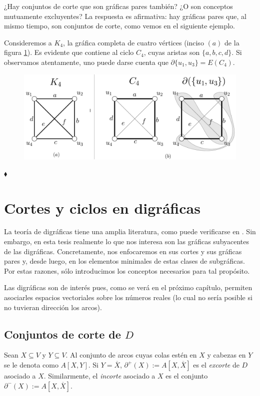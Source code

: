 ¿Hay conjuntos de corte que son gráficas pares también? ¿O son conceptos mutuamente excluyentes? La respuesta es afirmativa: hay gráficas pares que, al mismo tiempo, son conjuntos de corte, como vemos en el siguiente ejemplo.
\vspace{0.5cm}
\begin{ejem} \label{ejem:k4ciclocorte}
Consideremos a $K_{4}$, la gráfica completa de cuatro vértices (inciso $(a)$ de la figura \ref{fig:k4ciclocorte}). Es evidente que contiene al ciclo $C_{4}$, cuyas aristas son $\{a,b,c,d\}$. Si observamos atentamente, uno puede darse cuenta que $\partial{\{u_{1},u_{3}\}} = E(C_{4})$.

 \begin{figure}[H]
     \centering
     \includegraphics[scale=0.2]{img/imgchapter2/k4ciclocorte.jpg}
     \caption{}
     \label{fig:k4ciclocorte}
 \end{figure}

 \hfill $\blacklozenge$
\end{ejem}
 
 

 
 \section{Cortes y ciclos en digráficas}
 La teoría de digráficas tiene una amplia literatura, como puede verificarse en \cite{Bang-Jensen}. Sin embargo, en esta tesis realmente lo que nos interesa son las gráficas subyacentes de las digráficas. Concretamente, nos enfocaremos en sus cortes y sus gráficas pares y, desde luego, en los elementos minimales de estas clases de subgráficas. Por estas razones, sólo introducimos los conceptos necesarios para tal propósito.
 
 Las digráficas son de interés pues, como se verá en el próximo capítulo, permiten asociarles espacios vectoriales sobre los números reales (lo cual no sería posible si no tuvieran dirección los arcos).


 \subsection{Conjuntos de corte de $D$}
 Sean $X \subseteq V$ y $Y \subseteq V$. Al conjunto de arcos cuyas colas estén en $X$ y cabezas en $Y$ se le denota como $A[X,Y]$. Si $Y = \overline{X}$, $\partial^{+} (X) := A[X,\overline{X}]$ es el \textit{excorte} de $D$ asociado a $X$. Similarmente, el \textit{incorte}   asociado a $X$ es el conjunto $\partial^{-}(X) := A[X,\overline{X}]$. 
 
